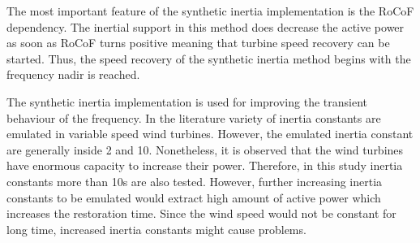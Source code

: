 The most important feature of the synthetic inertia implementation is the RoCoF dependency. The inertial support in this method does decrease the active power as soon as RoCoF turns positive meaning that turbine speed recovery can be started. Thus, the speed recovery of the synthetic inertia method begins with the frequency nadir is reached.\par
The synthetic inertia implementation is used for improving the transient behaviour of the frequency. In the literature variety of inertia constants are emulated in variable speed wind turbines. However, the emulated inertia constant are generally inside 2 and 10. Nonetheless, it is observed that the wind turbines have enormous capacity to increase their power. Therefore, in this study inertia constants more than 10s are also tested. However, further increasing inertia constants to be emulated would extract high amount of active power which increases the restoration time. Since the wind speed would not be constant for long time, increased inertia constants might cause problems.\par 
